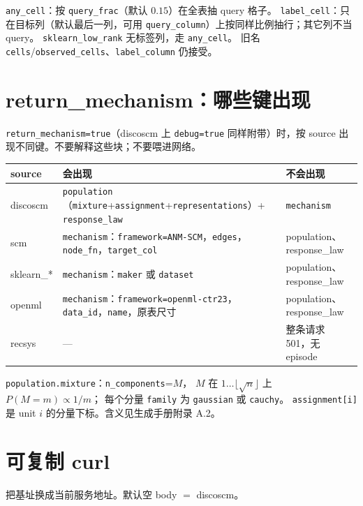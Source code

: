 \documentclass[11pt,a4paper,fontset=none]{ctexart}
\begin{document}
\texttt{any\_cell}：按 \texttt{query\_frac}（默认 $0.15$）在全表抽 query 格子。
\texttt{label\_cell}：只在目标列（默认最后一列，可用 \texttt{query\_column}）上按同样比例抽行；其它列不当 query。
\texttt{sklearn\_low\_rank} 无标签列，走 \texttt{any\_cell}。
旧名 \texttt{cells}/\texttt{observed\_cells}、\texttt{label\_column} 仍接受。

\section{return\_mechanism：哪些键出现}
\label{sec:mech}

\texttt{return\_mechanism=true}（discoscm 上 \texttt{debug=true} 同样附带）时，按 source 出现不同键。不要解释这些块；不要喂进网络。

{\small
\begin{center}
\begin{tabular}{@{}lp{7.2cm}p{3.6cm}@{}}
\toprule
source & 会出现 & 不会出现 \\
\midrule
discoscm & \texttt{population}（\texttt{mixture}+\texttt{assignment}+\texttt{representations}）+ \texttt{response\_law} & \texttt{mechanism} \\
scm & \texttt{mechanism}：\texttt{framework=ANM-SCM}，\texttt{edges}，\texttt{node\_fn}，\texttt{target\_col} & population、response\_law \\
sklearn\_* & \texttt{mechanism}：\texttt{maker} 或 \texttt{dataset} & population、response\_law \\
openml & \texttt{mechanism}：\texttt{framework=openml-ctr23}，\texttt{data\_id}，\texttt{name}，原表尺寸 & population、response\_law \\
recsys & --- & 整条请求 501，无 episode \\
\bottomrule
\end{tabular}
\end{center}
}

\texttt{population.mixture}：\texttt{n\_components}=$M$，
$M$ 在 $1\ldots\lfloor\sqrt{n}\rfloor$ 上 $P(M=m)\propto 1/m$；
每个分量 \texttt{family} 为 \texttt{gaussian} 或 \texttt{cauchy}。
\texttt{assignment[i]} 是 unit $i$ 的分量下标。含义见生成手册附录 A.2。

\section{可复制 curl}

把基址换成当前服务地址。默认空 body $=$ discoscm。
\end{document}
